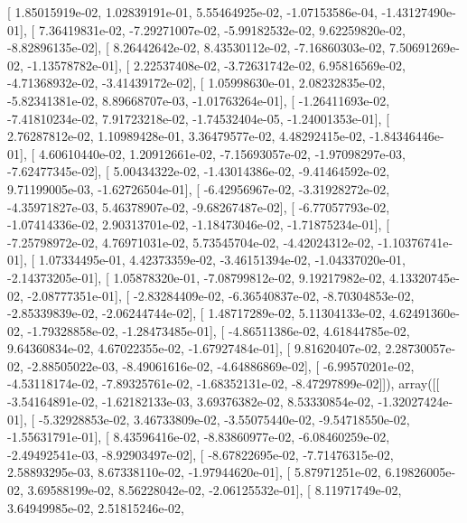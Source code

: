 \documentclass{article}
\begin{document}
       [  1.85015919e-02,   1.02839191e-01,   5.55464925e-02,
         -1.07153586e-04,  -1.43127490e-01],
       [  7.36419831e-02,  -7.29271007e-02,  -5.99182532e-02,
          9.62259820e-02,  -8.82896135e-02],
       [  8.26442642e-02,   8.43530112e-02,  -7.16860303e-02,
          7.50691269e-02,  -1.13578782e-01],
       [  2.22537408e-02,  -3.72631742e-02,   6.95816569e-02,
         -4.71368932e-02,  -3.41439172e-02],
       [  1.05998630e-01,   2.08232835e-02,  -5.82341381e-02,
          8.89668707e-03,  -1.01763264e-01],
       [ -1.26411693e-02,  -7.41810234e-02,   7.91723218e-02,
         -1.74532404e-05,  -1.24001353e-01],
       [  2.76287812e-02,   1.10989428e-01,   3.36479577e-02,
          4.48292415e-02,  -1.84346446e-01],
       [  4.60610440e-02,   1.20912661e-02,  -7.15693057e-02,
         -1.97098297e-03,  -7.62477345e-02],
       [  5.00434322e-02,  -1.43014386e-02,  -9.41464592e-02,
          9.71199005e-03,  -1.62726504e-01],
       [ -6.42956967e-02,  -3.31928272e-02,  -4.35971827e-03,
          5.46378907e-02,  -9.68267487e-02],
       [ -6.77057793e-02,  -1.07414336e-02,   2.90313701e-02,
         -1.18473046e-02,  -1.71875234e-01],
       [ -7.25798972e-02,   4.76971031e-02,   5.73545704e-02,
         -4.42024312e-02,  -1.10376741e-01],
       [  1.07334495e-01,   4.42373359e-02,  -3.46151394e-02,
         -1.04337020e-01,  -2.14373205e-01],
       [  1.05878320e-01,  -7.08799812e-02,   9.19217982e-02,
          4.13320745e-02,  -2.08777351e-01],
       [ -2.83284409e-02,  -6.36540837e-02,  -8.70304853e-02,
         -2.85339839e-02,  -2.06244744e-02],
       [  1.48717289e-02,   5.11304133e-02,   4.62491360e-02,
         -1.79328858e-02,  -1.28473485e-01],
       [ -4.86511386e-02,   4.61844785e-02,   9.64360834e-02,
          4.67022355e-02,  -1.67927484e-01],
       [  9.81620407e-02,   2.28730057e-02,  -2.88505022e-03,
         -8.49061616e-02,  -4.64886869e-02],
       [ -6.99570201e-02,  -4.53118174e-02,  -7.89325761e-02,
         -1.68352131e-02,  -8.47297899e-02]]), array([[ -3.54164891e-02,  -1.62182133e-03,   3.69376382e-02,
          8.53330854e-02,  -1.32027424e-01],
       [ -5.32928853e-02,   3.46733809e-02,  -3.55075440e-02,
         -9.54718550e-02,  -1.55631791e-01],
       [  8.43596416e-02,  -8.83860977e-02,  -6.08460259e-02,
         -2.49492541e-03,  -8.92903497e-02],
       [ -8.67822695e-02,  -7.71476315e-02,   2.58893295e-03,
          8.67338110e-02,  -1.97944620e-01],
       [  5.87971251e-02,   6.19826005e-02,   3.69588199e-02,
          8.56228042e-02,  -2.06125532e-01],
       [  8.11971749e-02,   3.64949985e-02,   2.51815246e-02,
\end{document}
